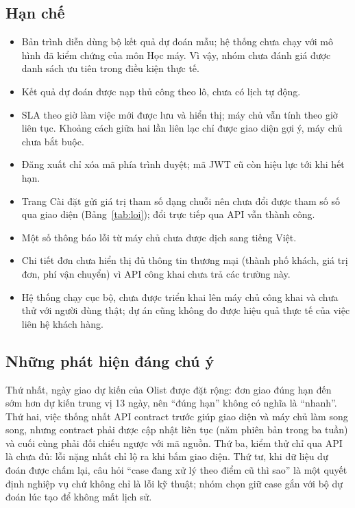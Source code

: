 \subsection{Hạn chế}

\begin{itemize}
    \item Bản trình diễn dùng bộ kết quả dự đoán mẫu; hệ thống chưa chạy với mô hình đã kiểm chứng
    của môn Học máy. Vì vậy, nhóm chưa đánh giá được danh sách ưu tiên trong điều kiện thực tế.
    \item Kết quả dự đoán được nạp thủ công theo lô, chưa có lịch tự động.
    \item SLA theo giờ làm việc mới được lưu và hiển thị; máy chủ vẫn tính theo giờ liên tục. Khoảng
    cách giữa hai lần liên lạc chỉ được giao diện gợi ý, máy chủ chưa bắt buộc.
    \item Đăng xuất chỉ xóa mã phía trình duyệt; mã JWT cũ còn hiệu lực tới khi hết hạn.
    \item Trang Cài đặt gửi giá trị tham số dạng chuỗi nên chưa đổi được tham số số qua giao diện
    (Bảng~\ref{tab:loi}); đổi trực tiếp qua API vẫn thành công.
    \item Một số thông báo lỗi từ máy chủ chưa được dịch sang tiếng Việt.
    \item Chi tiết đơn chưa hiển thị đủ thông tin thương mại (thành phố khách, giá trị đơn, phí vận
    chuyển) vì API công khai chưa trả các trường này.
    \item Hệ thống chạy cục bộ, chưa được triển khai lên máy chủ công khai và chưa thử với người dùng
    thật; dự án cũng không đo được hiệu quả thực tế của việc liên hệ khách hàng.
\end{itemize}

\subsection{Những phát hiện đáng chú ý}

Thứ nhất, ngày giao dự kiến của Olist được đặt rộng: đơn giao đúng hạn đến sớm hơn dự kiến trung vị
13 ngày, nên ``đúng hạn'' không có nghĩa là ``nhanh''. Thứ hai, việc thống nhất API contract trước
giúp giao diện và máy chủ làm song song, nhưng contract phải được cập nhật liên tục (năm phiên bản
trong ba tuần) và cuối cùng phải đối chiếu ngược với mã nguồn. Thứ ba, kiểm thử chỉ qua API là chưa
đủ: lỗi nặng nhất chỉ lộ ra khi bấm giao diện. Thứ tư, khi dữ liệu dự đoán được chấm lại, câu hỏi
``case đang xử lý theo điểm cũ thì sao'' là một quyết định nghiệp vụ chứ không chỉ là lỗi kỹ thuật;
nhóm chọn giữ case gắn với bộ dự đoán lúc tạo để không mất lịch sử.
